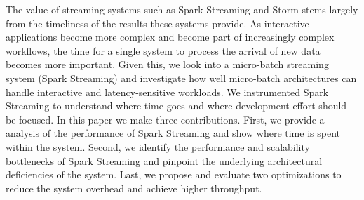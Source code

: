 The value of streaming systems such as Spark Streaming and Storm stems largely from the timeliness of the results these systems provide.
As interactive applications become more complex and become part of increasingly complex workflows, the time for a single system to process the arrival of new data becomes more important.
Given this, we look into a micro-batch streaming system (Spark Streaming) and investigate how well micro-batch architectures can handle interactive and latency-sensitive workloads. 
We instrumented Spark Streaming to understand where time goes and where development effort should be focused.
In this paper we make three contributions. 
First, we provide a analysis of the performance of Spark Streaming and show where time is spent within the system. 
Second, we identify the performance and scalability bottlenecks of Spark Streaming and pinpoint the underlying architectural deficiencies of the system. 
Last, we propose and evaluate two optimizations to reduce the system overhead and achieve higher throughput.
        

